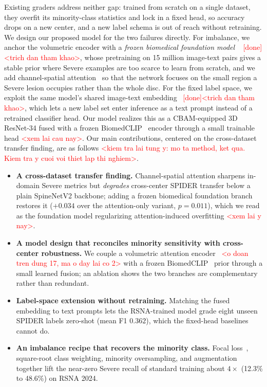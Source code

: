 \documentclass[runningheads]{llncs}
\begin{document}
Existing graders address neither gap: trained from scratch on a single dataset, they overfit its minority-class statistics and lock in a fixed head, so accuracy drops on a new center, and a new label schema is out of reach without retraining. We design our proposed model for the two failures directly. For imbalance, we anchor the volumetric encoder with a \emph{frozen biomedical foundation model} ~\cite{zhang2023biomedclip} \textcolor{red}{[done] <trich dan tham khao>}, whose pretraining on 15 million image-text pairs gives a stable prior where Severe examples are too scarce to learn from scratch, and we add channel-spatial attention~\cite{woo2018cbam} so that the network focuses on the small region a Severe lesion occupies rather than the whole disc. For the fixed label space, we exploit the same model's shared image-text embedding~\cite{radford2021clip} \textcolor{red}{[done]<trich dan tham khao>}, which lets a new label set enter inference as a text prompt instead of a retrained classifier head. Our model realizes this as a CBAM-equipped 3D ResNet-34 fused with a frozen BiomedCLIP~\cite{zhang2023biomedclip} encoder through a small trainable head \textcolor{red}{<xem lai cau nay>}. Our main contributions, centered on the cross-dataset transfer finding, are as follows \textcolor{red}{<kiem tra lai tung y: mo ta method, ket qua. Kiem tra y cuoi voi thiet lap thi nghiem>}.
\begin{itemize}
    \item \textbf{A cross-dataset transfer finding.} Channel-spatial attention sharpens in-domain Severe metrics but \emph{degrades} cross-center SPIDER transfer below a plain SpineNetV2 backbone; adding a frozen biomedical foundation branch restores it ($+0.034$ over the attention-only variant, $p=0.011$), which we read as the foundation model regularizing attention-induced overfitting \textcolor{red}{<xem lai y nay>}.
    \item \textbf{A model design that reconciles minority sensitivity with cross-center robustness.} We couple a volumetric attention encoder~\cite{woo2018cbam,he2016resnet} \textcolor{red}{<o doan tren dung 17, ma o day lai co 2>} with a frozen BiomedCLIP~\cite{zhang2023biomedclip} prior through a small learned fusion; an ablation shows the two branches are complementary rather than redundant.
    \item \textbf{Label-space extension without retraining.} Matching the fused embedding to text prompts lets the RSNA-trained model grade eight unseen SPIDER labels zero-shot (mean F1 $0.362$), which the fixed-head baselines cannot do.
    \item \textbf{An imbalance recipe that recovers the minority class.} Focal loss~\cite{lin2017focal}, square-root class weighting, minority oversampling, and augmentation together lift the near-zero Severe recall of standard training about $4\times$ (12.3\% to 48.6\%) on RSNA 2024.
\end{itemize}
\end{document}
